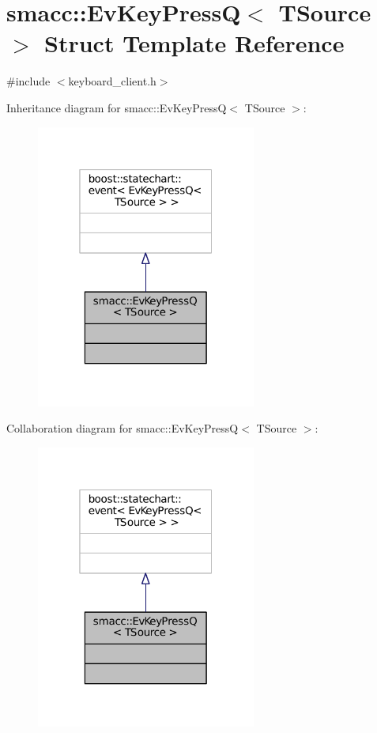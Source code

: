 \hypertarget{structsmacc_1_1EvKeyPressQ}{}\section{smacc\+:\+:Ev\+Key\+PressQ$<$ T\+Source $>$ Struct Template Reference}
\label{structsmacc_1_1EvKeyPressQ}


{\ttfamily \#include $<$keyboard\+\_\+client.\+h$>$}



Inheritance diagram for smacc\+:\+:Ev\+Key\+PressQ$<$ T\+Source $>$\+:
\nopagebreak
\begin{figure}[H]
\begin{center}
\leavevmode
\includegraphics[width=205pt]{structsmacc_1_1EvKeyPressQ__inherit__graph}
\end{center}
\end{figure}


Collaboration diagram for smacc\+:\+:Ev\+Key\+PressQ$<$ T\+Source $>$\+:
\nopagebreak
\begin{figure}[H]
\begin{center}
\leavevmode
\includegraphics[width=205pt]{structsmacc_1_1EvKeyPressQ__coll__graph}
\end{center}
\end{figure}


